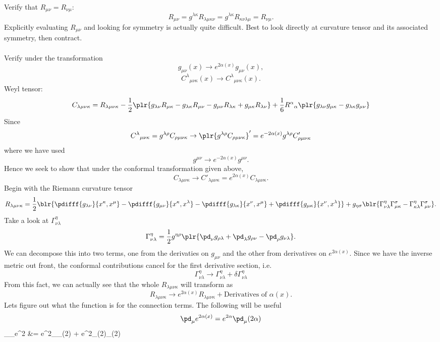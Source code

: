 \documentclass[10pt,letterpaper]{article}
\begin{document}
Verify that $R_{\mu\nu} = R_{\nu\mu}$:
\[
	R_{\mu\nu} = g^{\lambda\kappa}R_{\lambda\mu\kappa\nu} = g^{\lambda \kappa}R_{\kappa\nu\lambda\mu} = R_{\nu\mu}.
\]
Explicitly evaluating $R_{\mu\nu}$ and looking for symmetry is actually quite difficult. Best to look directly at curvature tensor and its associated symmetry, then contract. 
\\
\\
Verify under the transformation
\[
	g_{\mu\nu}(x) \to e^{2\alpha(x)} g_{\mu\nu}(x),
\]
\[
	C^{\lambda}{}_{\mu\nu\kappa}(x) \to C^\lambda{}_{\mu\nu\kappa}(x).
\]
Weyl tensor:
\[
	C_{\lambda\mu\nu\kappa} = R_{\lambda\mu\nu\kappa} - \frac12\plr{ g_{\lambda\nu}R_{\mu\kappa}-g_{\lambda\kappa}R_{\mu\nu}-g_{\mu\nu}R_{\lambda\kappa} + 
	g_{\mu\kappa}R_{\lambda\nu}}+\frac16 R^\alpha{}_\alpha\plr{g_{\lambda\nu}g_{\mu\kappa}-g_{\lambda\kappa}g_{\mu\nu}}
\]
Since 
\[
	C^\lambda{}_{\mu\nu\kappa} = g^{\lambda\rho}C_{\rho\mu\nu\kappa} \to \plr{ g^{\lambda\rho}C_{\rho\mu\nu\kappa}}' = e^{-2\alpha(x)}g^{\lambda\rho}C'_{\rho\mu\nu\kappa}
\]
where we have used
\[
	g^{\mu\nu} \to e^{-2\alpha(x)}g^{\mu\nu}.
\]
Hence we seek to show that under the conformal transformation given above,
\[
	C_{\lambda\mu\nu\kappa} \to C'_{\lambda\mu\nu\kappa} = e^{2\alpha(x)}C_{\lambda\mu\nu\kappa}.
\]
Begin with the Riemann curvature tensor 
\[
	R_{\lambda\mu\nu\kappa} = \frac12  \blr{ \pdifff{g_{\lambda\nu}}{x^\kappa,x^\mu} - \pdifff{g_{\mu\nu}}{x^\kappa,x^\lambda}
	-\pdifff{g_{\lambda\kappa}}{x^\nu,x^\mu} + \pdifff{g_{\mu\kappa}}{x^\nu,x^\lambda}}+ g_{\eta\sigma}\blr{
	\Gamma^{\eta}_{\nu\lambda}\Gamma^{\sigma}_{\mu\kappa} - \Gamma^{\eta}_{\kappa\lambda}\Gamma^{\sigma}_{\mu\nu} }.
\]
Take a look at $\Gamma^\eta_{\nu\lambda}$
\[
	\Gamma^\eta_{\nu\lambda} = \frac12 g^{\eta\rho}\plr{ \pd_\nu g_{\rho\lambda} + \pd_\lambda g_{\rho\nu} - \pd_\rho g_{\nu\lambda}}.
\]
We can decompose this into two terms, one from the derivaties on $g_{\mu\nu}$ and the other from derivatives on $e^{2\alpha(x)}$. Since we have the inverse metric out front, the conformal contributions cancel for the first derivative section, i.e.
\[
	\Gamma^\eta_{\nu\lambda} \to \Gamma^{\eta}_{\nu\lambda} + \delta\Gamma^\eta_{\nu\lambda}
\]
From this fact, we can actually see that the whole $R_{\lambda\mu\nu\kappa}$ will transform as
\[
	R_{\lambda\mu\nu\kappa} \to e^{2\alpha(x)}R_{\lambda\mu\nu\kappa} + \text{Derivatives of }\alpha(x).
\]
Lets figure out what the function is for the connection terms. The following will be useful 
\[
	\pd_\mu e^{2\alpha(x)} = e^{2\alpha}\pd_\mu (2\alpha)
\]
\ba
	\pd_\nu \pd_\mu e^{2\alpha} &= e^{2\alpha}\pd_\nu\pd_\mu (2\alpha) + e^{2\alpha}\pd_\nu(2\alpha)\pd_\mu (2\alpha) \\
\end{document}
